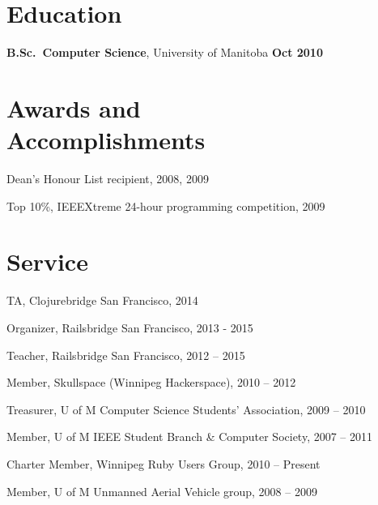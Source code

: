 \documentclass[margin,line,letterpaper]{resume}
\begin{document}
\begin{resume}
  \section{\mysidestyle Education}

  {\bf B.Sc.~Computer Science}, University of Manitoba \hfill {\bf Oct 2010}


  \section{\mysidestyle Awards and\\Accomplishments}

  \begin{list2}
    \item Dean's Honour List recipient, 2008, 2009
    \item Top 10\%, IEEEXtreme 24-hour programming competition, 2009
  \end{list2}


  \section{\mysidestyle Service}

  \begin{list2}
    \item TA, Clojurebridge San Francisco, 2014
    \item Organizer, Railsbridge San Francisco, 2013 - 2015
    \item Teacher, Railsbridge San Francisco, 2012 -- 2015
    \item Member, Skullspace (Winnipeg Hackerspace), 2010 -- 2012
    \item Treasurer, U of M Computer Science Students' Association, 2009 -- 2010
    \item Member, U of M IEEE Student Branch \& Computer Society, 2007 -- 2011
    \item Charter Member, Winnipeg Ruby Users Group, 2010 -- Present
    \item Member, U of M Unmanned Aerial Vehicle group, 2008 -- 2009
 \end{list2}




\end{resume}
\end{document}
